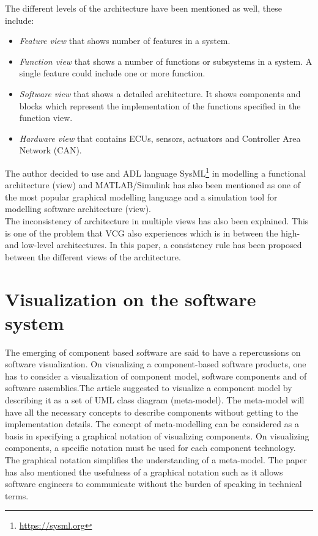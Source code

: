 The different levels of the architecture have been mentioned as well, these include:
\begin{itemize}
    \item \textit{Feature view} that shows number of features in a system.
    \item \textit{Function view} that shows a number of functions or subsystems in a system. A single feature could include one or more function.
    \item \textit{Software view} that shows a detailed architecture. It shows components and blocks which represent the implementation of the functions specified in the function view.
    \item \textit{Hardware view} that contains ECUs, sensors, actuators and Controller Area Network (CAN).
\end{itemize}
\vspace{0.2cm}
The author decided to use and ADL language SysML\footnote{\url{https://sysml.org}} in modelling a functional architecture (view) and MATLAB/Simulink has also been mentioned as one of the most popular graphical modelling language and a simulation tool for modelling software architecture (view). \\

The inconsistency of architecture in multiple views has also been explained. This is one of the problem that VCG also experiences which is in between the high- and low-level architectures. In this paper, a consistency rule has been proposed between the different views of the architecture.\\

\section{Visualization on the software system}
The emerging of component based software are said to have a repercussions on software visualization\cite{Jean}. On visualizing a component-based software products, one has to consider a visualization of  component model, software components and of software assemblies.The article suggested to visualize a component model by describing it as a set of UML class diagram (meta-model). The meta-model will have all the necessary concepts to describe components without getting to the implementation details. The concept of meta-modelling can be considered as a basis in specifying a graphical notation of visualizing components. On visualizing components, a specific notation must be used for each component technology. The graphical notation simplifies the understanding of a meta-model. The paper has also mentioned the usefulness of a graphical notation such as it allows software engineers to communicate without the burden of speaking in technical terms.\\

